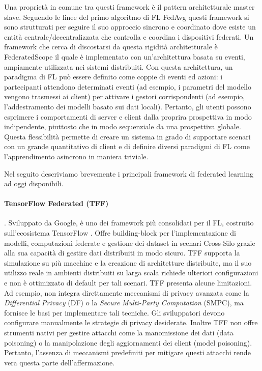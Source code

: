 \documentclass[a4paper, oneside, openright]{report}
\begin{document}
Una proprietà in comune tra questi framework è il pattern architetturale master slave. Seguendo le linee del primo algoritmo di FL FedAvg \cite{DBLP:journals/corr/McMahanMRA16} questi framework si sono strutturati per seguire il suo approccio sincrono e coordinato dove esiste un entità centrale/decentralizzata che controlla e coordina i dispositivi federati.
Un framework che cerca di discostarsi da questa rigidità architetturale è FederatedScope il quale è implementato con un'architettura basata su eventi, ampiamente utilizzata nei sistemi distribuiti. Con questa architettura, un paradigma di FL può essere definito come coppie di eventi ed azioni: i partecipanti attendono determinati eventi (ad esempio, i parametri del modello vengono trasmessi ai client) per attivare i gestori corrispondenti (ad esempio, l'addestramento dei modelli basato sui dati locali). Pertanto, gli utenti possono esprimere i comportamenti di server e client dalla proprira prospettiva in modo indipendente, piuttosto che in modo sequenziale da una prospettiva globale.
Questa flessibilità permette di creare un sistema in grado di supportare scenari con un grande quantitativo di client e di definire diversi paradigmi di FL come l'apprendimento asincrono in maniera triviale.

Nel seguito descriviamo brevemente i principali framework di federated learning ad oggi disponibili.

\paragraph{TensorFlow Federated (TFF)} \cite{tff}. Sviluppato da Google, è uno dei framework più consolidati per il FL, costruito sull'ecosistema TensorFlow \cite{tf}. Offre building-block per l'implementazione di modelli, computazioni federate e gestione dei dataset in scenari Cross-Silo grazie alla sua capacità di gestire dati distribuiti in modo sicuro. 
TFF supporta la simulazione su più macchine e la creazione di architetture distribuite, ma il suo utilizzo reale in ambienti distribuiti su larga scala richiede ulteriori configurazioni e non è ottimizzato di default per tali scenari. TFF presenta alcune limitazioni. Ad esempio, non integra direttamente meccanismi di privacy avanzata come la \textit{Differential Privacy} (DF) o la \textit{Secure Multi-Party Computation} (SMPC), ma fornisce le basi per implementare tali tecniche. Gli sviluppatori devono configurare manualmente le strategie di privacy desiderate. Inoltre TFF non offre strumenti nativi per gestire attacchi come la manomissione dei dati (data poisoning) o la manipolazione degli aggiornamenti dei client (model poisoning). Pertanto, l'assenza di meccanismi predefiniti per mitigare questi attacchi rende vera questa parte dell'affermazione.
\end{document}
